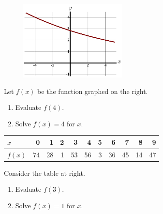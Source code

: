 \begin{enumerate}
\vspace{120pt}

\begin{minipage}{\linewidth}
\begin{figure}
    \centering
    \vspace{-12pt}
    \includegraphics[width=0.48\textwidth]{img/chap1/sec1-2/prob8.png}
\end{figure}

\item Let $f(x)$ be the function graphed on the right.
    \begin{enumerate}
        \item Evaluate $f(4)$.
        \item Solve $f(x) = 4$ for $x$.
    \end{enumerate}
\end{minipage}


\vspace{120pt}

\begin{minipage}{\linewidth}
\begin{table}
    \centering
    \vspace{-12pt}
    \begin{longtable}[]{@{}lrrrrrrrrrr@{}}
    \toprule
    $x$ & 0 & 1 & 2 & 3 & 4 & 5 & 6 & 7 & 8 & 9\tabularnewline
    \midrule
    \endhead
    $f(x)$ & 74 & 28 & 1 & 53 & 56 & 3 & 36 & 45 & 14 & 47\tabularnewline
    \bottomrule
    \end{longtable}
\end{table}

\item Consider the table at right.
    \begin{enumerate}
        \item Evaluate $f(3)$.
        \item Solve $f(x) = 1$ for $x$.
    \end{enumerate}
\end{minipage}


\end{enumerate}
